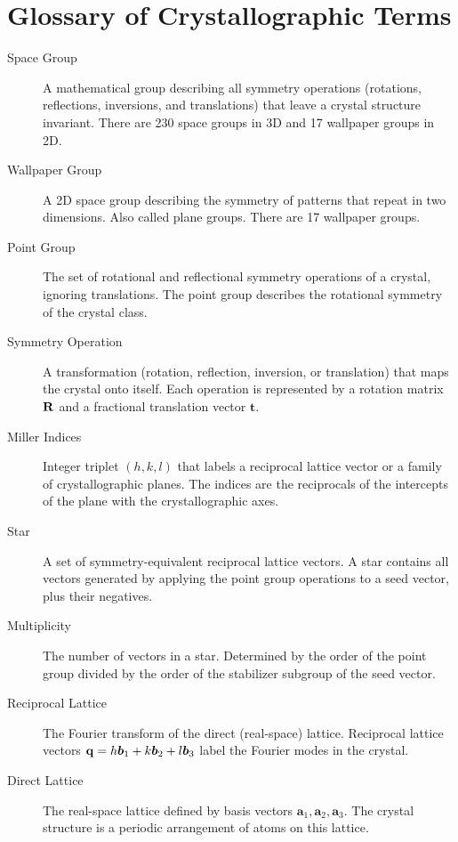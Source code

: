 \section*{Glossary of Crystallographic Terms}

\begin{description}
\item[Space Group] A mathematical group describing all symmetry operations (rotations, reflections, inversions, and translations) that leave a crystal structure invariant. There are 230 space groups in 3D and 17 wallpaper groups in 2D.

\item[Wallpaper Group] A 2D space group describing the symmetry of patterns that repeat in two dimensions. Also called plane groups. There are 17 wallpaper groups.

\item[Point Group] The set of rotational and reflectional symmetry operations of a crystal, ignoring translations. The point group describes the rotational symmetry of the crystal class.

\item[Symmetry Operation] A transformation (rotation, reflection, inversion, or translation) that maps the crystal onto itself. Each operation is represented by a rotation matrix $\mathbf{R}$ and a fractional translation vector $\boldsymbol{t}$.

\item[Miller Indices] Integer triplet $(h, k, l)$ that labels a reciprocal lattice vector or a family of crystallographic planes. The indices are the reciprocals of the intercepts of the plane with the crystallographic axes.

\item[Star] A set of symmetry-equivalent reciprocal lattice vectors. A star contains all vectors generated by applying the point group operations to a seed vector, plus their negatives.

\item[Multiplicity] The number of vectors in a star. Determined by the order of the point group divided by the order of the stabilizer subgroup of the seed vector.

\item[Reciprocal Lattice] The Fourier transform of the direct (real-space) lattice. Reciprocal lattice vectors $\mathbf{q} = h\boldsymbol{b}_1 + k\boldsymbol{b}_2 + l\boldsymbol{b}_3$ label the Fourier modes in the crystal.

\item[Direct Lattice] The real-space lattice defined by basis vectors $\boldsymbol{a}_1, \boldsymbol{a}_2, \boldsymbol{a}_3$. The crystal structure is a periodic arrangement of atoms on this lattice.


\end{description}
